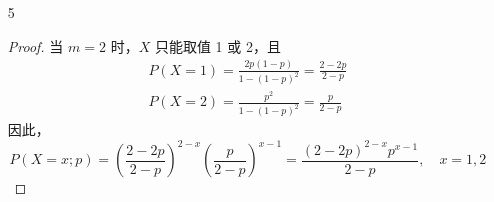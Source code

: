 \documentclass[normal,founder,mtpro2,cn]{elegantnote}
\begin{document}
\begin{enumerate}
\begin{proof}
\begin{enumerate}
                      故 $\theta$ 的最大似然估计为 $\hat{\theta}$ 是 $\left(X_{(n)}-\frac{1}{2},X_{(1)}+\frac{1}{2}\right)$ 中任何一个值。
                \item
                      样本 $x_{1},x_{2},\ldots,x_{n}$ 的似然函数为
                      \begin{equation*}
                          \begin{aligned}
                              L\left(\theta_{1},\theta_{2}\right)= & \prod_{i=1}^{n}\frac{1}{\theta_{2}-\theta_{1}}\mathrm{I}_{\theta_{1}<x_{i}<\theta_{2}}                      \\
                              =                                    & \frac{1}{\left(\theta_{2}-\theta_{1}\right)^{n}}\mathrm{I}_{\theta_{1}<x_{1},x_{2},\ldots,x_{n}<\theta_{2}}
                          \end{aligned}
                      \end{equation*}

                      显然 $\theta_{1}$ 越大且 $\theta_{2}$ 越小时， $\frac{1}{\left(\theta_{2}-\theta_{1}\right)^{n}}$ 越大，且由于示性函数的限制，仅当 $\theta_{1}<x_{1},x_{2},\ldots,x_{n}<\theta_{2}$ 时，$L\left(\theta_{1},\theta_{2}\right)>0$。因此，$\theta_{1}=\min\left\{x_{1},x_{2},\ldots,x_{n}\right\}=x_{(1)},\theta_{2}=\max\left\{x_{1},x_{2},\ldots,x_{n}\right\}=x_{(n)}$ 时, $L\left(\theta_{1},\theta_{2}\right)$ 达到最大。

                      故 $\theta_{1}$ 的最大似然估计为 $\hat{\theta}_{1}=X_{(1)}$，$\theta_{2}$ 的最大似然估计为 $\hat{\theta}_{2}=X_{(n)}$。
            \end{enumerate}
        \end{proof}
    \item[5]
        \begin{proof}
            当 $m=2$ 时，$X$ 只能取值 1 或 2，且
            \begin{gather*}
                P\left(X=1\right)=\frac{2p(1-p)}{1-(1-p)^{2}}=\frac{2-2p}{2-p} \\
                P\left(X=2\right)=\frac{p^{2}}{1-(1-p)^{2}}=\frac{p}{2-p}
            \end{gather*}
            因此，
            \begin{equation*}
                P\left(X=x;p\right)=\left(\frac{2-2p}{2-p}\right)^{2-x}\left(\frac{p}{2-p}\right)^{x-1}=\frac{(2-2p)^{2-x}p^{x-1}}{2-p},\quad x=1,2
            \end{equation*}


\end{proof}
\end{enumerate}
\end{document}
